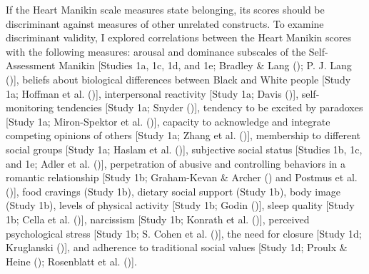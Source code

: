 \documentclass[
]{udthesis}
\begin{document}
If the Heart Manikin scale measures state belonging, its scores should
be discriminant against measures of other unrelated constructs. To
examine discriminant validity, I explored correlations between the Heart
Manikin scores with the following measures: arousal and dominance
subscales of the Self-Assessment Manikin
{[}Studies 1a, 1c, 1d, and 1e; Bradley \& Lang (); P. J. Lang (){]}, beliefs about
biological differences between Black and White people
{[}Study 1a; Hoffman et al. (){]},
interpersonal reactivity
{[}Study 1a; Davis (){]}, self-monitoring
tendencies {[}Study 1a; Snyder (){]}, tendency to be
excited by paradoxes {[}Study 1a; Miron-Spektor et al. (){]}, capacity to
acknowledge and integrate competing opinions of others
{[}Study 1a; Zhang et al. (){]}, membership
to different social groups {[}Study 1a; Haslam et al. (){]},
subjective social
status {[}Studies 1b, 1c, and 1e;
Adler et al. (){]}, perpetration of
abusive and controlling behaviors in a romantic relationship {[}Study 1b;
Graham-Kevan \& Archer () and Postmus et al. (){]},
food cravings (Study 1b), dietary social support (Study 1b), body image (Study 1b), levels of
physical activity {[}Study 1b;
Godin (){]}, sleep quality
{[}Study 1b; Cella et al. (){]}, narcissism {[}Study
1b; Konrath et al. (){]},
perceived psychological stress {[}Study 1b;
S. Cohen et al. (){]}, the need for closure
{[}Study 1d; Kruglanski (){]}, and adherence to
traditional social values {[}Study 1d; Proulx \& Heine (); Rosenblatt et al. (){]}.
\end{document}
